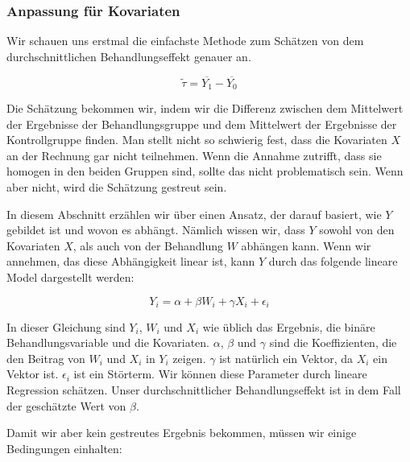 \documentclass[12pt,a4paper,twoside]{scrartcl}
\numberwithin{equation}{section}
\begin{document}
\subsubsection{Anpassung für Kovariaten}\label{subsubsec:anpassungKovariaten}
Wir schauen uns erstmal die einfachste Methode zum Schätzen von dem durchschnittlichen Behandlungseffekt genauer an.\par

\begin{equation}\label{eq:2.1}
  \widetilde{\tau} = \overline{Y_1}-\overline{Y_0}
\end{equation}

\noindent
Die Schätzung bekommen wir, indem wir die Differenz zwischen dem Mittelwert der Ergebnisse der Behandlungsgruppe und dem Mittelwert der Ergebnisse der Kontrollgruppe finden. Man stellt nicht so schwierig fest, dass die Kovariaten $X$ an der Rechnung gar nicht teilnehmen. Wenn die Annahme zutrifft, dass sie homogen in den beiden Gruppen sind, sollte das nicht problematisch sein. Wenn aber nicht, wird die Schätzung gestreut sein.\par

\noindent
In diesem Abschnitt erzählen wir über einen Ansatz, der darauf basiert, wie $Y$ gebildet ist und wovon es abhängt. Nämlich wissen wir, dass $Y$ sowohl von den Kovariaten $X$, als auch von der Behandlung $W$ abhängen kann. Wenn wir annehmen, das diese Abhängigkeit linear ist, kann $Y$ durch das folgende lineare Model dargestellt werden:\par 

\begin{equation}\label{eq:2.2}
  Y_i = \alpha + \beta W_i + \gamma X_i + \epsilon_i
\end{equation}

\noindent
In dieser Gleichung sind $Y_i$, $W_i$ und $X_i$ wie üblich das Ergebnis, die binäre Behandlungsvariable und die Kovariaten. $\alpha$, $\beta$ und $\gamma$ sind die Koeffizienten, die den Beitrag von $W_i$ und $X_i$ in $Y_i$ zeigen. $\gamma$ ist natürlich ein Vektor, da $X_i$ ein Vektor ist. $\epsilon_i$ ist ein Störterm. Wir können diese Parameter durch lineare Regression schätzen. Unser durchschnittlicher Behandlungseffekt ist in dem Fall der geschätzte Wert von $\beta$\cite{cox1982biometrics}.\par

\noindent
Damit wir aber kein gestreutes Ergebnis bekommen, müssen wir einige Bedingungen einhalten:\par
\end{document}

